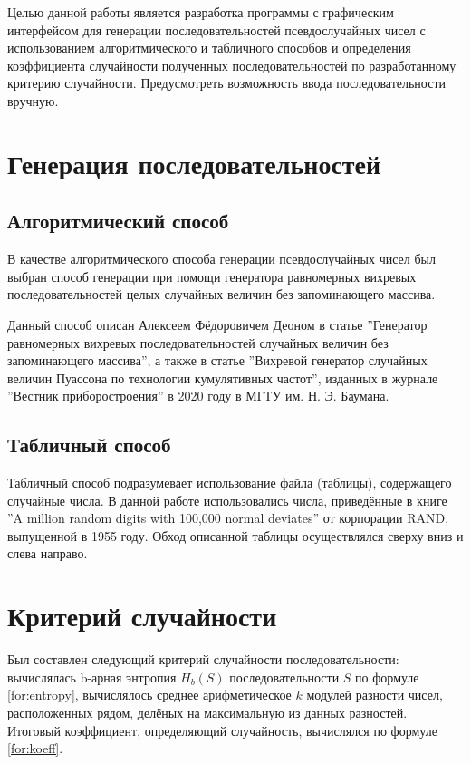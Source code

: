  Целью данной работы является разработка программы с графическим интерфейсом для генерации последовательностей псевдослучайных чисел с использованием алгоритмического и табличного способов и определения коэффициента случайности полученных последовательностей по разработанному критерию случайности. Предусмотреть возможность ввода последовательности вручную.

\section*{Генерация последовательностей}

\subsection*{Алгоритмический способ}

В качестве алгоритмического способа генерации псевдослучайных чисел был выбран способ генерации при помощи генератора равномерных вихревых последовательностей целых случайных величин без запоминающего массива.

Данный способ описан Алексеем Фёдоровичем Деоном в статье ''Генератор равномерных вихревых последовательностей случайных величин без запоминающего массива'', а также в статье ''Вихревой генератор случайных величин Пуассона  по технологии кумулятивных частот'', изданных в журнале ''Вестник приборостроения'' в 2020 году в МГТУ им. Н. Э. Баумана.

	

\subsection*{Табличный способ}

Табличный способ подразумевает использование файла (таблицы), содержащего случайные числа.
В данной работе использовались числа, приведённые в книге ''A million random digits with 100,000 normal deviates'' от корпорации RAND, выпущенной в 1955 году. Обход описанной таблицы осуществлялся сверху вниз и слева направо.

\section*{Критерий случайности}

Был составлен следующий критерий случайности последовательности: вычислялась b-арная энтропия $H_b(S)$ последовательности $S$ по формуле \ref{for:entropy}, вычислялось среднее арифметическое $k$ модулей разности чисел, расположенных рядом, делёных на максимальную из данных разностей. Итоговый коэффициент, определяющий случайность, вычислялся по формуле \ref{for:koeff}.


